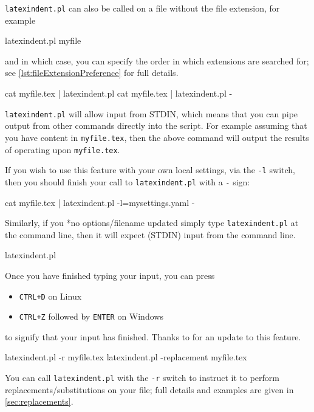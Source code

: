  \texttt{latexindent.pl} can also be called on a file without the file extension, for
 example
 \begin{commandshell}
latexindent.pl myfile
\end{commandshell}
 and in which case, you can specify the order in which extensions are searched for; see
 \vref{lst:fileExtensionPreference} for full details. 
 \begin{commandshell}
cat myfile.tex | latexindent.pl
cat myfile.tex | latexindent.pl -
\end{commandshell}
 \texttt{latexindent.pl} will%
  allow input from STDIN, which means that you can
 pipe output from other commands directly into the script. For example assuming that you
 have content in \texttt{myfile.tex}, then the above command will output the results of
 operating upon \texttt{myfile.tex}.

 If you wish to use this feature with your own local settings, via the \texttt{-l} switch,
 then you should finish your call to \texttt{latexindent.pl} with a \texttt{-} sign:
 \begin{commandshell}
cat myfile.tex | latexindent.pl -l=mysettings.yaml -
\end{commandshell}

 Similarly, if you *{no options/filename updated} simply type
 \texttt{latexindent.pl} at the command line, then it will expect (STDIN) input from the
 command line.%
 \begin{commandshell}
latexindent.pl
\end{commandshell}

 Once you have finished typing your input, you can press
 \begin{itemize}
  \item \texttt{CTRL+D} on Linux
  \item \texttt{CTRL+Z} followed by \texttt{ENTER} on Windows
 \end{itemize}
 to signify that your input has finished. Thanks to \cite{xu-cheng} for an update to this
 feature.  
 \begin{commandshell}
latexindent.pl -r myfile.tex
latexindent.pl -replacement myfile.tex
\end{commandshell}
 You can  call \texttt{latexindent.pl} with
 the \texttt{-r} switch to instruct it to perform replacements/substitutions on your file;
 full details and examples are given in \vref{sec:replacements}. %

